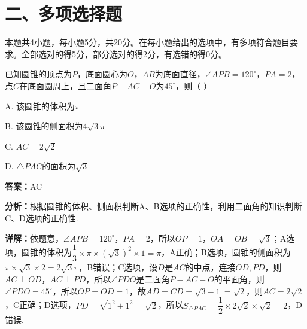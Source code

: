 \section*{二、多项选择题}
本题共4小题，每小题5分，共20分。在每小题给出的选项中，有多项符合题目要求。全部选对的得5分，部分选对的得2分，有选错的得0分。

\begin{question}[points=5]
已知圆锥的顶点为$P$，底面圆心为$O$，$AB$为底面直径，$\angle APB=120^{\circ}$，$PA=2$，点$C$在底面圆周上，且二面角$P-AC-O$为$45^{\circ}$，则（ \quad ）
\begin{choices}
  \item A. 该圆锥的体积为$\pi$
  \item B. 该圆锥的侧面积为$4\sqrt{3}\pi$
  \item C. $AC=2\sqrt{2}$
  \item D. $\triangle PAC$的面积为$\sqrt{3}$
\end{choices}
\begin{solution}
\textbf{答案：}AC

\textbf{分析：}根据圆锥的体积、侧面积判断A、B选项的正确性，利用二面角的知识判断C、D选项的正确性.

\textbf{详解：}依题意，$\angle APB=120^{\circ}$，$PA=2$，所以$OP=1$，$OA=OB=\sqrt{3}$；A选项，圆锥的体积为$\dfrac{1}{3}\times\pi\times(\sqrt{3})^{2}\times1=\pi$，A正确；B选项，圆锥的侧面积为$\pi\times\sqrt{3}\times2=2\sqrt{3}\pi$，B错误；C选项，设$D$是$AC$的中点，连接$OD,PD$，则$AC\perp OD$，$AC\perp PD$，所以$\angle PDO$是二面角$P-AC-O$的平面角，则$\angle PDO=45^{\circ}$，所以$OP=OD=1$，故$AD=CD=\sqrt{3-1}=\sqrt{2}$，则$AC=2\sqrt{2}$，C正确；D选项，$PD=\sqrt{1^{2}+1^{2}}=\sqrt{2}$，所以$S_{\triangle PAC}=\dfrac{1}{2}\times2\sqrt{2}\times\sqrt{2}=2$，D错误.
\end{solution}
\end{question}


